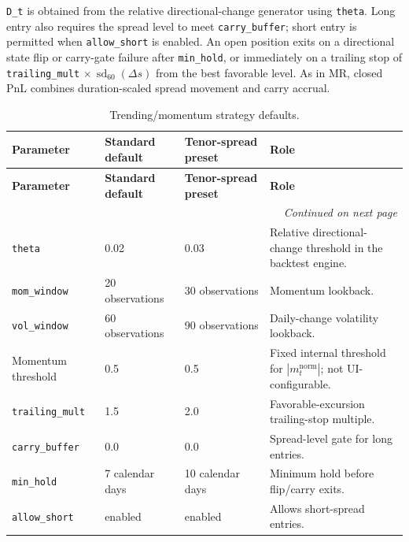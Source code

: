 \texttt{D\_t} is obtained from the relative directional-change generator using \texttt{theta}.
Long entry also requires the spread level to meet \texttt{carry\_buffer}; short entry is
permitted when \texttt{allow\_short} is enabled. An open position exits on a directional
state flip or carry-gate failure after \texttt{min\_hold}, or immediately on a trailing
stop of \texttt{trailing\_mult} $\times\, \operatorname{sd}_{60}(\Delta s)$ from the best favorable level.
As in MR, closed PnL combines duration-scaled spread movement and carry accrual.

{\small
\setlength{\LTleft}{0pt}
\setlength{\LTright}{0pt}
\setlength{\tabcolsep}{5pt}
\renewcommand{\arraystretch}{1.15}
\begin{longtable}{p{} p{} p{} p{}}
\caption{Trending/momentum strategy defaults.}\label{tab:pairs-trend-defaults-overleaf} \\
\toprule
\textbf{Parameter} & \textbf{Standard default} & \textbf{Tenor-spread preset} & \textbf{Role} \\
\midrule
\endfirsthead
\toprule
\textbf{Parameter} & \textbf{Standard default} & \textbf{Tenor-spread preset} & \textbf{Role} \\
\midrule
\endhead
\midrule
\multicolumn{4}{r}{\textit{Continued on next page}} \\
\midrule
\endfoot
\bottomrule
\endlastfoot
\texttt{theta} & 0.02 & 0.03 & Relative directional-change threshold in the backtest engine. \\
\texttt{mom\_window} & 20 observations & 30 observations & Momentum lookback. \\
\texttt{vol\_window} & 60 observations & 90 observations & Daily-change volatility lookback. \\
Momentum threshold & 0.5 & 0.5 & Fixed internal threshold for $\left|m_t^{\mathrm{norm}}\right|$; not UI-configurable. \\
\texttt{trailing\_mult} & 1.5 & 2.0 & Favorable-excursion trailing-stop multiple. \\
\texttt{carry\_buffer} & 0.0 & 0.0 & Spread-level gate for long entries. \\
\texttt{min\_hold} & 7 calendar days & 10 calendar days & Minimum hold before flip/carry exits. \\
\texttt{allow\_short} & enabled & enabled & Allows short-spread entries. \\
\end{longtable}
}

